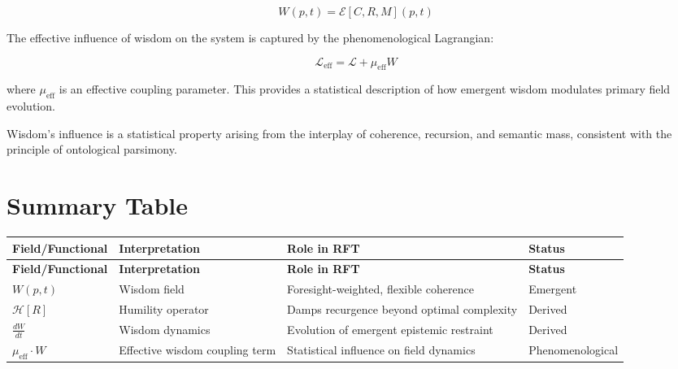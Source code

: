 \begin{equation}
W(p, t) = \mathcal{E}[C, R, M](p, t)
\end{equation}

The effective influence of wisdom on the system is captured by the phenomenological Lagrangian:

\begin{equation}
\mathcal{L}_{\text{eff}} = \mathcal{L} + \mu_{\text{eff}} W
\end{equation}

where \(\mu_{\text{eff}}\) is an effective coupling parameter. This provides a statistical description of how emergent wisdom modulates primary field evolution.

Wisdom's influence is a statistical property arising from the interplay of coherence, recursion, and semantic mass, consistent with the principle of ontological parsimony.

\section{Summary Table}

{\footnotesize
\begin{longtable}{|p{2.5cm}|p{4cm}|p{4.5cm}|p{2.5cm}|}
\hline
\textbf{Field/Functional} & \textbf{Interpretation} & \textbf{Role in RFT} & \textbf{Status} \\
\hline
\endfirsthead
\hline
\textbf{Field/Functional} & \textbf{Interpretation} & \textbf{Role in RFT} & \textbf{Status} \\
\hline
\endhead
\(W(p, t)\) & Wisdom field & Foresight-weighted, flexible coherence & Emergent \\
\hline
\(\mathcal{H}[R]\) & Humility operator & Damps recurgence beyond optimal complexity & Derived \\
\hline
\(\frac{dW}{dt}\) & Wisdom dynamics & Evolution of emergent epistemic restraint & Derived \\
\hline
\(\mu_{\text{eff}} \cdot W\) & Effective wisdom coupling term & Statistical influence on field dynamics & Phenomenological \\
\hline
\end{longtable}
} 